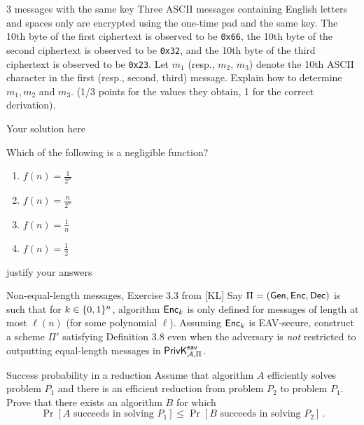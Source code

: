 \documentclass[a4paper,10pt]{article}
\begin{document}
\begin{nquestion}{2}{3 messages with the same key}
Three ASCII messages containing English letters and spaces only are encrypted using the one-time pad and the same key. The 10th byte of the first ciphertext is observed to be \texttt{0x66}, the 10th byte of the second ciphertext is observed to be \texttt{0x32}, and the 10th byte of the third ciphertext is observed to be \texttt{0x23}. Let $m_1$ (resp., $m_2$, $m_3$) denote the 10th ASCII character in the first (resp., second, third) message. Explain how to determine $m_1, m_2$ and $m_3$. (1/3 points for the values they obtain, 1 for the correct derivation).
\end{nquestion}
\begin{solution}
  Your solution here
\end{solution}

\begin{question}{1}
Which of the following is a negligible function?

\begin{enumerate}
\item $f(n) = \frac{1}{2^n}$
\item $f(n) = \frac{n}{2^n}$
\item $f(n) = \frac{1}{n}$
\item $f(n) = \frac{1}{2}$
\end{enumerate}
\end{question}

\begin{solution}
justify your answers
\end{solution}

\begin{nquestion}{3}{Non-equal-length messages, Exercise 3.3 from [KL]}
Say $\Pi=(\mathsf{Gen}, \mathsf{Enc}, \mathsf{Dec})$ is such that for $k \in \{0,1\}^n$, algorithm $\mathsf{Enc}_k$ is only defined for messages of length at most $\ell(n)$ (for some polynomial $\ell$). Assuming $\mathsf{Enc}_k$ is EAV-secure, construct a scheme $\Pi'$ satisfying Definition 3.8 even when the adversary is \emph{not} restricted to outputting equal-length messages in $\mathsf{PrivK}^{\mathsf{eav}}_{\mathcal{A}, \Pi}$.
\end{nquestion}
\begin{solution}
\end{solution}

\begin{nquestion}{2}{Success probability in a reduction}
Assume that algorithm $A$ efficiently solves problem $P_1$ and there is an efficient reduction from problem $P_2$ to problem $P_1$. Prove that there exists an algorithm $B$ for which
\[
\Pr[A \text{ succeeds in solving $P_1$}] \leq \Pr[B \text{ succeeds in solving $P_2$}] \, .
\]
\end{nquestion}
\end{document}

